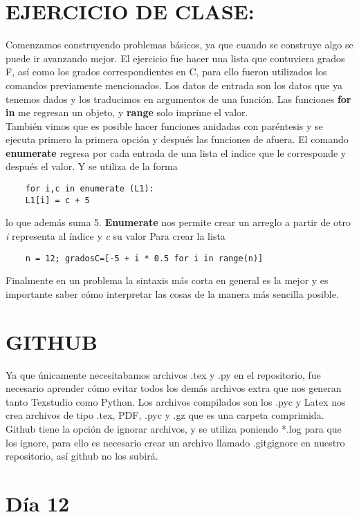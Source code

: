 \documentclass{book}
\begin{document}
	\section{EJERCICIO DE CLASE:}
	
	Comenzamos construyendo problemas básicos, ya que cuando se construye algo se puede ir avanzando mejor. El ejercicio fue hacer una lista que contuviera grados F, así como los grados correspondientes en C, para ello fueron utilizados los comandos previamente mencionados. Los datos de entrada son los datos que ya tenemos dados y los traducimos en argumentos de una función.
	Las funciones \textbf{for in} me regresan un objeto, y \textbf{range} solo imprime el valor.\\
	También vimos que es posible hacer funciones anidadas con paréntesis y se ejecuta primero la primera opción  y después las funciones de afuera.
	El comando \textbf{enumerate} regresa por cada entrada de una lista el indice que le corresponde y después el valor. Y se utiliza de la forma 
	\begin{verbatim}
	for i,c in enumerate (L1):
	L1[i] = c + 5
	\end{verbatim}
	lo que además suma 5. \textbf{Enumerate} nos permite crear un arreglo a partir de otro \textit{i} representa al índice y \textit{c} su valor
	Para crear la lista 
	\begin{verbatim}
	n = 12; gradosC=[-5 + i * 0.5 for i in range(n)]
	\end{verbatim}
	
	Finalmente en un problema la sintaxis más corta en general es la mejor y es importante saber cómo interpretar las cosas de la manera más sencilla posible.
	
	\section{GITHUB}
	Ya que únicamente necesitabamos archivos .tex y .py en el repositorio, fue necesario aprender cómo evitar todos los demás archivos extra que nos generan tanto Texstudio como Python. Los archivos compilados son los .pyc y Latex nos crea archivos de tipo .tex, PDF, .pyc y .gz  que es una carpeta comprimida. \\
	Github tiene la opción de ignorar archivos, y se utiliza poniendo *.log para que los ignore, para ello es necesario crear un archivo llamado .gitgignore en nuestro repositorio, así github no los subirá.
	
	
	
	\section{Día 12}
\end{document}
